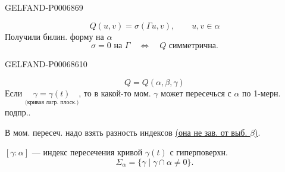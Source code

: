 \begin{GelfandAdjacentEvidence}{GELFAND-P000686}{9}

\[
Q(u,v)=\sigma(\Gamma u,v),\qquad u,v\in\alpha
\]
Получили билин. форму на \(\alpha\)
\[
\sigma=0\text{ на }\Gamma\quad\Leftrightarrow\quad Q\text{ симметрична.}
\]
\end{GelfandAdjacentEvidence}
\begin{GelfandAdjacentEvidence}{GELFAND-P000686}{10}

\[
Q=Q(\alpha,\beta,\gamma)
\]
Если \(\underset{\text{(кривая лагр. плоск.)}}{\gamma=\gamma(t)}\), то в какой-то мом. \(\gamma\) может пересечься с \(\alpha\)
по 1-мерн. подпр..

В мом. пересеч. надо взять разность индексов \underline{(она не зав. от выб. \(\beta\))}.

\([\gamma:\alpha]\) --- индекс пересечения кривой \(\gamma(t)\) с гиперповерхн.
\[
\Sigma_\alpha=\{\gamma\mid\gamma\cap\alpha\ne0\}.
\]
\end{GelfandAdjacentEvidence}



